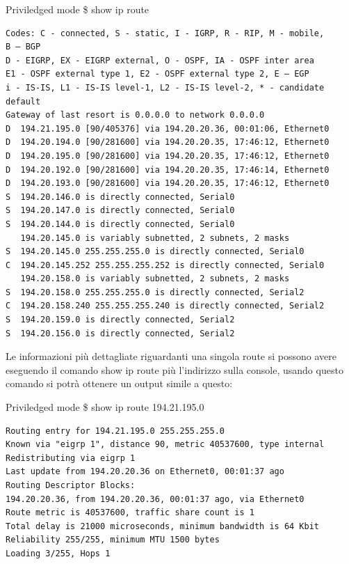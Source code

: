 \begin{fcmds}{Priviledged mode}
    \$ show ip route
\end{fcmds}

\begin{verbatim}
Codes: C - connected, S - static, I - IGRP, R - RIP, M - mobile,
B – BGP
D - EIGRP, EX - EIGRP external, O - OSPF, IA - OSPF inter area 
E1 - OSPF external type 1, E2 - OSPF external type 2, E – EGP
i - IS-IS, L1 - IS-IS level-1, L2 - IS-IS level-2, * - candidate
default
Gateway of last resort is 0.0.0.0 to network 0.0.0.0
D  194.21.195.0 [90/405376] via 194.20.20.36, 00:01:06, Ethernet0
D  194.20.194.0 [90/281600] via 194.20.20.35, 17:46:12, Ethernet0
D  194.20.195.0 [90/281600] via 194.20.20.35, 17:46:12, Ethernet0
D  194.20.192.0 [90/281600] via 194.20.20.35, 17:46:14, Ethernet0
D  194.20.193.0 [90/281600] via 194.20.20.35, 17:46:12, Ethernet0
S  194.20.146.0 is directly connected, Serial0
S  194.20.147.0 is directly connected, Serial0
S  194.20.144.0 is directly connected, Serial0
   194.20.145.0 is variably subnetted, 2 subnets, 2 masks
S  194.20.145.0 255.255.255.0 is directly connected, Serial0
C  194.20.145.252 255.255.255.252 is directly connected, Serial0
   194.20.158.0 is variably subnetted, 2 subnets, 2 masks
S  194.20.158.0 255.255.255.0 is directly connected, Serial2
C  194.20.158.240 255.255.255.240 is directly connected, Serial2
S  194.20.159.0 is directly connected, Serial2
S  194.20.156.0 is directly connected, Serial2
\end{verbatim}

Le informazioni più dettagliate riguardanti una singola route si possono avere eseguendo il comando show ip route più l'indirizzo sulla console, usando questo comando si potrà ottenere un output simile a questo:

\begin{fcmds}{Priviledged mode}
    \$ show ip route 194.21.195.0
\end{fcmds}

\begin{verbatim}
Routing entry for 194.21.195.0 255.255.255.0
Known via "eigrp 1", distance 90, metric 40537600, type internal
Redistributing via eigrp 1
Last update from 194.20.20.36 on Ethernet0, 00:01:37 ago
Routing Descriptor Blocks:
194.20.20.36, from 194.20.20.36, 00:01:37 ago, via Ethernet0
Route metric is 40537600, traffic share count is 1
Total delay is 21000 microseconds, minimum bandwidth is 64 Kbit
Reliability 255/255, minimum MTU 1500 bytes
Loading 3/255, Hops 1
\end{verbatim}

